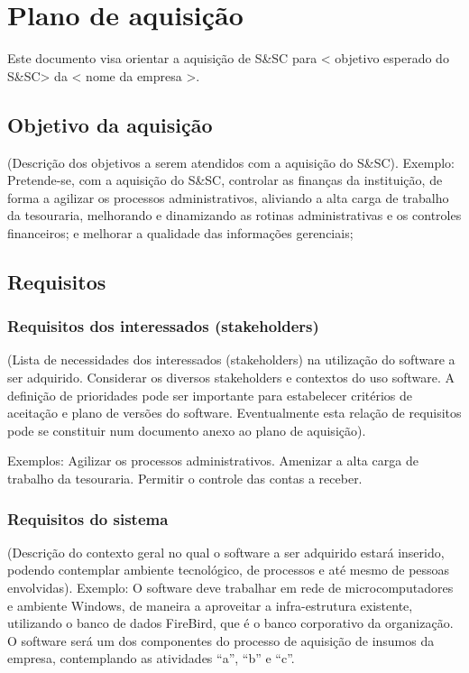 \chapter{Plano de aquisição}

Este documento visa orientar a aquisição de S\&SC
para < objetivo esperado do S\&SC> da < nome da empresa >.

\section{Objetivo da aquisição}
(Descrição dos objetivos a serem atendidos com a aquisição do S\&SC).
Exemplo: Pretende-se, com a aquisição do S\&SC, controlar as finanças da
instituição, de forma a agilizar os processos administrativos, aliviando a alta carga
de trabalho da tesouraria, melhorando e dinamizando as rotinas administrativas e os
controles financeiros; e melhorar a qualidade das informações gerenciais;

\section{Requisitos}
\subsection{Requisitos dos interessados (stakeholders)}

(Lista de necessidades dos interessados (stakeholders) na utilização do
software a ser adquirido. Considerar os diversos stakeholders e contextos do uso
software. A definição de prioridades pode ser importante para estabelecer critérios
de aceitação e plano de versões do software. Eventualmente esta relação de
requisitos pode se constituir num documento anexo ao plano de aquisição).

Exemplos:
Agilizar os processos administrativos.
Amenizar a alta carga de trabalho da tesouraria.
Permitir o controle das contas a receber.

\subsection{Requisitos do sistema}
(Descrição do contexto geral no qual o software a ser adquirido estará
inserido, podendo contemplar ambiente tecnológico, de processos e até mesmo de
pessoas envolvidas).
Exemplo: O software deve trabalhar em rede de microcomputadores e
ambiente Windows, de maneira a aproveitar a infra-estrutura existente, utilizando o
banco de dados FireBird, que é o banco corporativo da organização. O software
será um dos componentes do processo de aquisição de insumos da empresa,
contemplando as atividades “a”, “b” e “c”.

